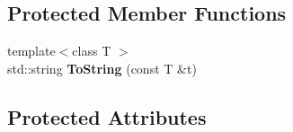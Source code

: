 \subsection*{Protected Member Functions}
\begin{DoxyCompactItemize}
\item 
\hypertarget{class_c_irr_event_receiver_a7b422fae43376f2ebecfa08b921fa01f}{
{\footnotesize template$<$class T $>$ }\\std::string {\bfseries ToString} (const T \&t)}
\label{class_c_irr_event_receiver_a7b422fae43376f2ebecfa08b921fa01f}

\end{DoxyCompactItemize}
\subsection*{Protected Attributes}
